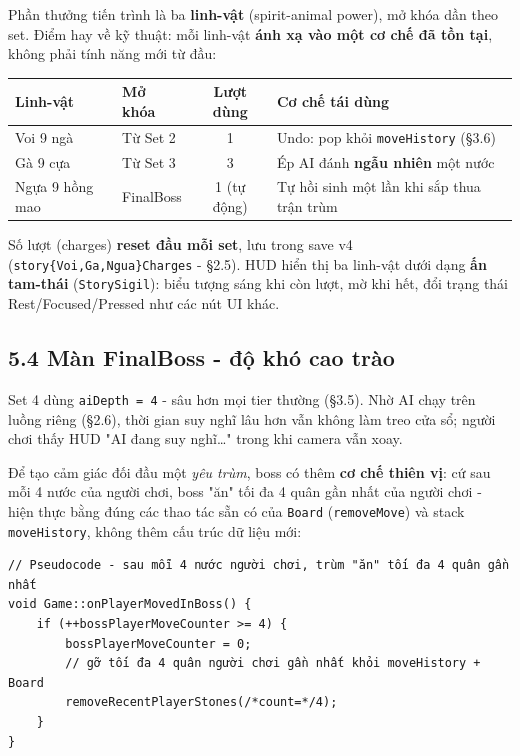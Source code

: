 \documentclass[11pt,a4paper]{article}
\begin{document}
Phần thưởng tiến trình là ba \textbf{linh-vật} (spirit-animal power), mở khóa dần theo set. Điểm hay về kỹ thuật: mỗi linh-vật \textbf{ánh xạ vào một cơ chế đã tồn tại}, không phải tính năng mới từ đầu:

\begin{center}
\begin{tabularx}{\textwidth}{llcX}
Linh-vật & Mở khóa & Lượt dùng & Cơ chế tái dùng\\
\hline
Voi 9 ngà & Từ Set 2 & 1 & Undo: pop khỏi \texttt{moveHistory} (§3.6)\\
Gà 9 cựa & Từ Set 3 & 3 & Ép AI đánh \textbf{ngẫu nhiên} một nước\\
Ngựa 9 hồng mao & FinalBoss & 1 (tự động) & Tự hồi sinh một lần khi sắp thua trận trùm\\
\end{tabularx}
\end{center}

Số lượt (charges) \textbf{reset đầu mỗi set}, lưu trong save v4 (\texttt{story\{Voi,Ga,Ngua\}Charges} - §2.5). HUD hiển thị ba linh-vật dưới dạng \textbf{ấn tam-thái} (\texttt{StorySigil}): biểu tượng sáng khi còn lượt, mờ khi hết, đổi trạng thái Rest/Focused/Pressed như các nút UI khác.

\subsection{5.4 Màn FinalBoss - độ khó cao trào}
\label{sec:story-boss}

Set 4 dùng \texttt{aiDepth = 4} - sâu hơn mọi tier thường (§3.5). Nhờ AI chạy trên luồng riêng (§2.6), thời gian suy nghĩ lâu hơn vẫn không làm treo cửa sổ; người chơi thấy HUD "AI đang suy nghĩ…" trong khi camera vẫn xoay.

Để tạo cảm giác đối đầu một \emph{yêu trùm}, boss có thêm \textbf{cơ chế thiên vị}: cứ sau mỗi 4 nước của người chơi, boss "ăn" tối đa 4 quân gần nhất của người chơi - hiện thực bằng đúng các thao tác sẵn có của \texttt{Board} (\texttt{removeMove}) và stack \texttt{moveHistory}, không thêm cấu trúc dữ liệu mới:

\begin{verbatim}
// Pseudocode - sau mỗi 4 nước người chơi, trùm "ăn" tối đa 4 quân gần nhất
void Game::onPlayerMovedInBoss() {
    if (++bossPlayerMoveCounter >= 4) {
        bossPlayerMoveCounter = 0;
        // gỡ tối đa 4 quân người chơi gần nhất khỏi moveHistory + Board
        removeRecentPlayerStones(/*count=*/4);
    }
}
\end{verbatim}
\end{document}
